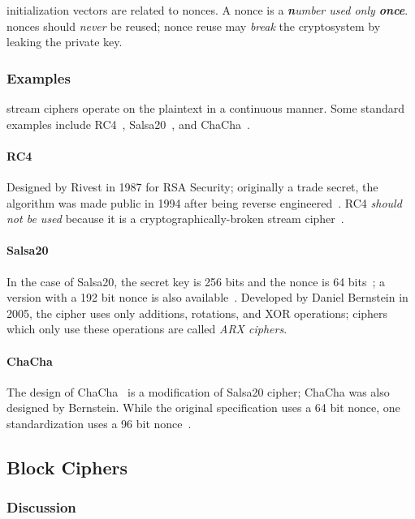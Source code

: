 \Glspl{initialization vector} are related to \glspl{nonce}.
A \gls{nonce} is a \emph{\textbf{n}umber used only \textbf{once}}.
\Glspl{nonce} should \emph{never} be reused;
\gls{nonce} reuse may \emph{break} the cryptosystem by leaking the private key.

\subsubsection{Examples}

\Glspl{stream cipher} operate on the plaintext in a continuous manner.
Some standard examples include RC4~\cite{rivest2016spritz},
Salsa20~\cite{salsa20}, and ChaCha~\cite{chacha}.

\paragraph{RC4}
Designed by Rivest in 1987 for RSA Security;
originally a trade secret, the algorithm was made public in 1994 after being
reverse engineered~\cite{rivest2016spritz}.
RC4 \emph{should not be used} because it is a cryptographically-broken
\gls{stream cipher}~\cite{rfc7465,rivest2016spritz}.

\paragraph{Salsa20}
In the case of Salsa20, the secret key is 256 bits
and the \gls{nonce} is 64 bits~\cite{salsa20};
a version with a 192 bit \gls{nonce} is also available~\cite{xsalsa20}.
Developed by Daniel Bernstein in 2005,
the cipher uses only additions, rotations, and XOR operations;
ciphers which only use these operations are called \emph{ARX ciphers}.

\paragraph{ChaCha}
The design of ChaCha~\cite{chacha} is a modification of Salsa20 cipher;
ChaCha was also designed by Bernstein.
While the original specification uses a 64 bit nonce,
one standardization uses a 96 bit nonce~\cite{rfc8439}.


\subsection{Block Ciphers}
\label{ssec:block_cipher}

\subsubsection{Discussion}

